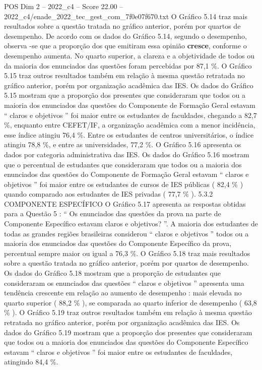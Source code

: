 \begin{textsample}{POS Dim 2 – 2022\_c4 – Score 22.00 – 2022\_c4/enade\_2022\_tec\_gest\_com\_7f0e07f670.txt}
O Gráfico 5.14 traz mais resultados sobre a questão tratada no gráfico anterior, porém por quartos de desempenho.
De acordo com os dados do Gráfico 5.14, segundo o desempenho, observa -se que a proporção dos que emitiram essa opinião \textbf{cresce}, conforme o desempenho aumenta.
No quarto superior, a clareza e a objetividade de todos ou da maioria dos enunciados das questões foram percebidas por 87,1 \%.
O Gráfico 5.15 traz outros resultados também em relação à mesma questão retratada no gráfico anterior, porém por organização acadêmica das IES.
Os dados do Gráfico 5.15 mostram que a proporção dos presentes que consideraram que todos ou a maioria dos enunciados das questões do Componente de Formação Geral estavam “ claros e objetivos ” foi maior entre os estudantes de faculdades, chegando a 82,7 \%, enquanto entre CEFET/IF, a organização acadêmica com a menor incidência, esse índice atingiu 76,4 \%.
Entre os estudantes de centros universitários, o índice atingiu 78,8 \%, e entre as universidades, 77,2 \%.
O Gráfico 5.16 apresenta os dados por categoria administrativa das IES.
Os dados do Gráfico 5.16 mostram que o percentual de estudantes que consideraram que todos ou a maioria dos enunciados das questões do Componente de Formação Geral estavam “ claros e objetivos ” foi maior entre os estudantes de cursos de IES públicas ( 82,4 \% ) quando comparado aos estudantes de IES privadas ( 77,7 \% ). 5.3.2 COMPONENTE ESPECÍFICO O Gráfico 5.17 apresenta as respostas obtidas para a Questão 5 : “ Os enunciados das questões da prova na parte de Componente Específico estavam claros e objetivos? ”.
A maioria dos estudantes de todas as grandes regiões brasileiras considerou “ claros e objetivos ” todos ou a maioria dos enunciados das questões do Componente Específico da prova, percentual sempre maior ou igual a 76,3 \%.
O Gráfico 5.18 traz mais resultados sobre a questão tratada no gráfico anterior, porém por quartos de desempenho.
Os dados do Gráfico 5.18 mostram que a proporção de estudantes que consideraram os enunciados das questões “ claros e objetivos ” apresenta uma tendência crescente em relação ao aumento de desempenho : mais elevada no quarto superior ( 88,2 \% ), se comparada ao quarto inferior de desempenho ( 63,8 \% ).
O Gráfico 5.19 traz outros resultados também em relação à mesma questão retratada no gráfico anterior, porém por organização acadêmica das IES.
Os dados do Gráfico 5.19 mostram que a proporção dos presentes que consideraram que todos ou a maioria dos enunciados das questões do Componente Específico estavam “ claros e objetivos ” foi maior entre os estudantes de faculdades, atingindo 84,4 \%.

\end{textsample}
